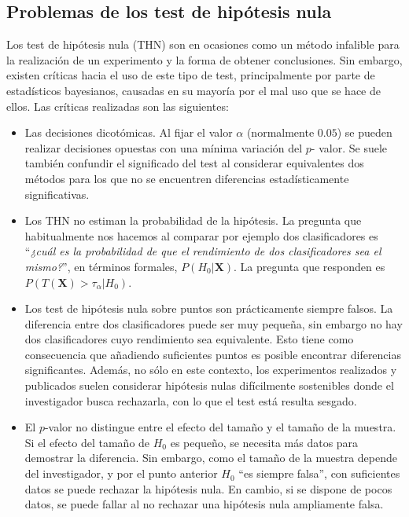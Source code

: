 \subsection{Problemas de los test de hipótesis nula}	

	Los test de hipótesis nula (THN) son en ocasiones como un
método infalible para la realización de un experimento y la
forma de obtener conclusiones. Sin embargo, existen críticas
hacia el uso de este tipo de test, principalmente por parte 
de estadísticos bayesianos, causadas en su mayoría por el mal
uso que se hace de ellos. Las críticas realizadas son las
siguientes:

\begin{itemize}
\item Las decisiones dicotómicas. Al fijar el valor 
	$\alpha$ (normalmente $0.05$) se pueden realizar 
	decisiones opuestas con una mínima variación del $p$-
	valor. Se suele también confundir el significado del 
	test al considerar equivalentes dos métodos para los que
	no se encuentren diferencias estadísticamente 
	significativas.
\item Los THN no estiman la probabilidad
	de la hipótesis. La pregunta que habitualmente nos
	hacemos al comparar por ejemplo dos clasificadores es
	``\textit{¿cuál es la probabilidad de que el rendimiento
	de dos clasificadores sea el mismo?}'', en términos
	formales, $P(H_0 | \mathbf{X})$. La pregunta que
	responden es $P(T(\mathbf{X}) > \tau_\alpha | H_0)$.
\item Los test de hipótesis nula sobre puntos son
	prácticamente siempre falsos. La diferencia entre
	dos clasificadores puede ser muy pequeña, sin embargo
	no hay dos clasificadores cuyo rendimiento sea 
	equivalente. Esto tiene como consecuencia que añadiendo
	suficientes puntos es posible encontrar diferencias
	significantes. Además, no sólo en este contexto, los
	experimentos realizados y publicados suelen considerar
	hipótesis nulas difícilmente sostenibles donde el
	investigador busca rechazarla, con lo que el test está
	resulta sesgado.
\item El $p$-valor no distingue entre el efecto del tamaño
	y el tamaño de la muestra. Si el efecto del tamaño de
	$H_0$ es pequeño, se necesita más datos para demostrar 
	la diferencia. Sin embargo, como el tamaño de la muestra
	depende del investigador, y por el punto anterior $H_0$ 
	``es siempre falsa'', con suficientes datos se puede
	rechazar la hipótesis nula. En cambio, si se dispone 
	de pocos datos, se puede fallar al no rechazar una
	hipótesis nula ampliamente falsa.

\end{itemize}
